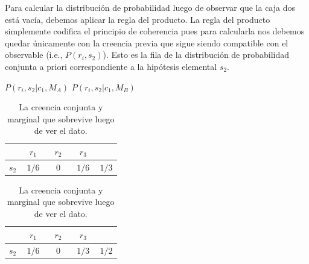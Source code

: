 \documentclass[a4paper,11pt]{book}
\theoremstyle{definition}
\begin{document}

Para calcular la distribuci\'on de probabilidad luego de observar que la caja dos est\'a vac\'ia, debemos aplicar la regla del producto.
%
La regla del producto simplemente codifica el principio de coherencia pues para calcularla nos debemos quedar \'unicamente con la creencia previa que sigue siendo compatible con el observable (i.e., $P(r_i, s_2)$).
Esto es la fila de la distribuci\'on de probabilidad conjunta a priori correspondiente a la hip\'otesis elemental $s_2$.
%
\begin{table}[ht!]
\centering
$P(r_i, s_2 |c_1, M_A)$ \hspace{4.3cm} $P(r_i, s_2 | c_1, M_B)$ \\[0.1cm]
\begin{tabular}{|c|c|c|c||c|} \hline \setlength\tabcolsep{0.2cm}
       & \, $r_1$ \, &  \, $r_2$ \, & \, $r_3$ \, & \\ \hline
  $s_2$ & $1/6$ & $0$ & $1/6$ & $1/3$ \\ \hline
  \end{tabular}
  \hspace{1.5cm}
  \begin{tabular}{|c|c|c|c||c|} \hline  \setlength\tabcolsep{0.2cm}
 & \, $r_1$ \, &  \, $r_2$ \, & \, $r_3$ \, & \\ \hline
  $s_2$ & $1/6$ & $0$ & $1/3$ & $1/2$ \\ \hline
  \end{tabular}
  \caption{La creencia conjunta y marginal que sobrevive luego de ver el dato.}
  \label{tab:creencia_compatible}
\end{table}

\end{document}
